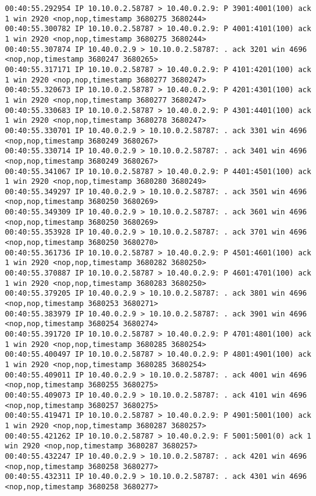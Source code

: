 \documentclass[a4paper,12pt]{article}
\begin{document}
\begin{Verbatim}
00:40:55.292954 IP 10.10.0.2.58787 > 10.40.0.2.9: P 3901:4001(100) ack 1 win 2920 <nop,nop,timestamp 3680275 3680244>
00:40:55.300782 IP 10.10.0.2.58787 > 10.40.0.2.9: P 4001:4101(100) ack 1 win 2920 <nop,nop,timestamp 3680275 3680244>
00:40:55.307874 IP 10.40.0.2.9 > 10.10.0.2.58787: . ack 3201 win 4696 <nop,nop,timestamp 3680247 3680265>
00:40:55.317171 IP 10.10.0.2.58787 > 10.40.0.2.9: P 4101:4201(100) ack 1 win 2920 <nop,nop,timestamp 3680277 3680247>
00:40:55.320673 IP 10.10.0.2.58787 > 10.40.0.2.9: P 4201:4301(100) ack 1 win 2920 <nop,nop,timestamp 3680277 3680247>
00:40:55.330683 IP 10.10.0.2.58787 > 10.40.0.2.9: P 4301:4401(100) ack 1 win 2920 <nop,nop,timestamp 3680278 3680247>
00:40:55.330701 IP 10.40.0.2.9 > 10.10.0.2.58787: . ack 3301 win 4696 <nop,nop,timestamp 3680249 3680267>
00:40:55.330714 IP 10.40.0.2.9 > 10.10.0.2.58787: . ack 3401 win 4696 <nop,nop,timestamp 3680249 3680267>
00:40:55.341067 IP 10.10.0.2.58787 > 10.40.0.2.9: P 4401:4501(100) ack 1 win 2920 <nop,nop,timestamp 3680280 3680249>
00:40:55.349297 IP 10.40.0.2.9 > 10.10.0.2.58787: . ack 3501 win 4696 <nop,nop,timestamp 3680250 3680269>
00:40:55.349309 IP 10.40.0.2.9 > 10.10.0.2.58787: . ack 3601 win 4696 <nop,nop,timestamp 3680250 3680269>
00:40:55.353928 IP 10.40.0.2.9 > 10.10.0.2.58787: . ack 3701 win 4696 <nop,nop,timestamp 3680250 3680270>
00:40:55.361736 IP 10.10.0.2.58787 > 10.40.0.2.9: P 4501:4601(100) ack 1 win 2920 <nop,nop,timestamp 3680282 3680250>
00:40:55.370887 IP 10.10.0.2.58787 > 10.40.0.2.9: P 4601:4701(100) ack 1 win 2920 <nop,nop,timestamp 3680283 3680250>
00:40:55.379205 IP 10.40.0.2.9 > 10.10.0.2.58787: . ack 3801 win 4696 <nop,nop,timestamp 3680253 3680271>
00:40:55.383979 IP 10.40.0.2.9 > 10.10.0.2.58787: . ack 3901 win 4696 <nop,nop,timestamp 3680254 3680274>
00:40:55.391720 IP 10.10.0.2.58787 > 10.40.0.2.9: P 4701:4801(100) ack 1 win 2920 <nop,nop,timestamp 3680285 3680254>
00:40:55.400497 IP 10.10.0.2.58787 > 10.40.0.2.9: P 4801:4901(100) ack 1 win 2920 <nop,nop,timestamp 3680285 3680254>
00:40:55.409011 IP 10.40.0.2.9 > 10.10.0.2.58787: . ack 4001 win 4696 <nop,nop,timestamp 3680255 3680275>
00:40:55.409073 IP 10.40.0.2.9 > 10.10.0.2.58787: . ack 4101 win 4696 <nop,nop,timestamp 3680257 3680275>
00:40:55.419471 IP 10.10.0.2.58787 > 10.40.0.2.9: P 4901:5001(100) ack 1 win 2920 <nop,nop,timestamp 3680287 3680257>
00:40:55.421262 IP 10.10.0.2.58787 > 10.40.0.2.9: F 5001:5001(0) ack 1 win 2920 <nop,nop,timestamp 3680287 3680257>
00:40:55.432247 IP 10.40.0.2.9 > 10.10.0.2.58787: . ack 4201 win 4696 <nop,nop,timestamp 3680258 3680277>
00:40:55.432311 IP 10.40.0.2.9 > 10.10.0.2.58787: . ack 4301 win 4696 <nop,nop,timestamp 3680258 3680277>

\end{Verbatim}
\end{document}
